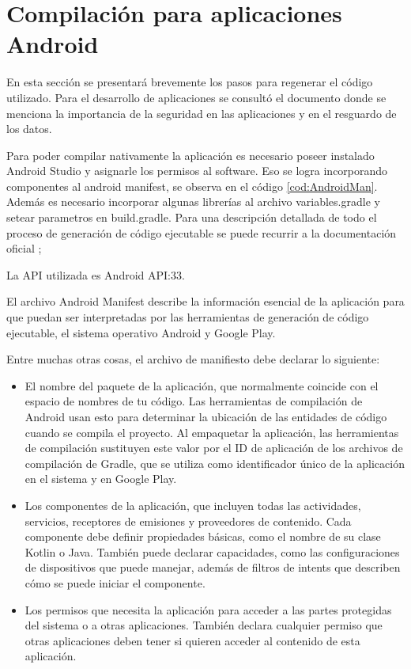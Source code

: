
\chapter{Compilación para aplicaciones Android} %

\label{AppendixC} %

En esta sección se presentará brevemente los pasos para regenerar el código utilizado. Para el desarrollo de aplicaciones se consultó el documento \citep{BOOK:3} donde se menciona la importancia de la seguridad en las aplicaciones y en el resguardo de los datos.

Para poder compilar nativamente la aplicación es necesario poseer instalado Android Studio \citep{WEBSITE:41} y asignarle los permisos al software. Eso se logra incorporando componentes al android manifest, se observa en el código \ref{cod:AndroidMan}. Además es necesario incorporar algunas librerías al archivo variables.gradle y setear parametros en build.gradle. Para una descripción detallada de todo el proceso de generación de código ejecutable se puede recurrir a la documentación oficial \citep{WEBSITE:42};

La API utilizada es Android API:33.

El archivo Android Manifest describe la información esencial de la aplicación para que puedan ser interpretadas por las herramientas de generación de código ejecutable, el sistema operativo Android y Google Play.

Entre muchas otras cosas, el archivo de manifiesto debe declarar lo siguiente:
\begin{itemize}


\item El nombre del paquete de la aplicación, que normalmente coincide con el espacio de nombres de tu código. Las herramientas de compilación de Android usan esto para determinar la ubicación de las entidades de código cuando se compila el proyecto. Al empaquetar la aplicación, las herramientas de compilación sustituyen este valor por el ID de aplicación de los archivos de compilación de Gradle, que se utiliza como identificador único de la aplicación en el sistema y en Google Play. 
\item Los componentes de la aplicación, que incluyen todas las actividades, servicios, receptores de emisiones y proveedores de contenido. Cada componente debe definir propiedades básicas, como el nombre de su clase Kotlin o Java. También puede declarar capacidades, como las configuraciones de dispositivos que puede manejar, además de filtros de intents que describen cómo se puede iniciar el componente. 
\item Los permisos que necesita la aplicación para acceder a las partes protegidas del sistema o a otras aplicaciones. También declara cualquier permiso que otras aplicaciones deben tener si quieren acceder al contenido de esta aplicación. 
\end{itemize}

